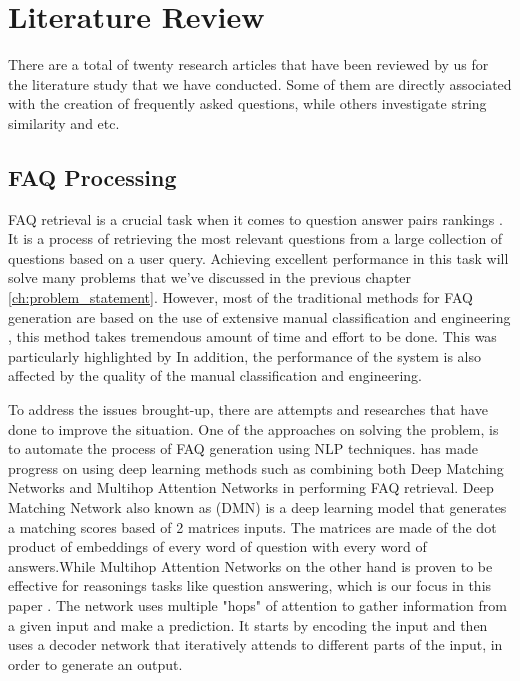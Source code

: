 \chapter{Literature Review}
There are a total of twenty research articles that have been reviewed by us for the literature study that we have conducted. Some of them are directly associated with the creation of frequently asked questions, while others investigate string similarity and etc.

\pagebreak
\section{FAQ Processing}
FAQ retrieval is a crucial task when it comes to question answer pairs rankings \cite{faq_gen_1}. It is a process of retrieving the most relevant questions from a large collection of questions based on a user query. Achieving excellent performance in this task will solve many problems that we've discussed in the previous chapter \ref*{ch:problem_statement}. However, most of the traditional methods for FAQ generation are based on the use of extensive manual classification and engineering \cite{faq_gen_1}, this method takes tremendous amount of time and effort to be done. This was particularly highlighted by \cite{10.1007/978-3-319-18356-5_30} \cite{5615722} \cite{6227139} \cite{7817112} In addition, the performance of the system is also affected by the quality of the manual classification and engineering.

To address the issues brought-up, there are attempts and researches that have done to improve the situation. One of the approaches on solving the problem, is to automate the process of FAQ generation using NLP techniques. \cite{faq_gen_1} has made progress on using deep learning methods such as combining both Deep Matching Networks and Multihop Attention Networks in performing FAQ retrieval. Deep Matching Network also known as (DMN) is a deep learning model that generates a matching scores based of 2 matrices inputs. The matrices are made of the dot product of embeddings of every word of question with every word of answers.While Multihop Attention Networks on the other hand is proven to be effective for reasonings tasks like question answering, which is our focus in this paper \cite{faq_gen_1}. The network uses multiple "hops" of attention to gather information from a given input and make a prediction. It starts by encoding the input and then uses a decoder network that iteratively attends to different parts of the input, in order to generate an output.

